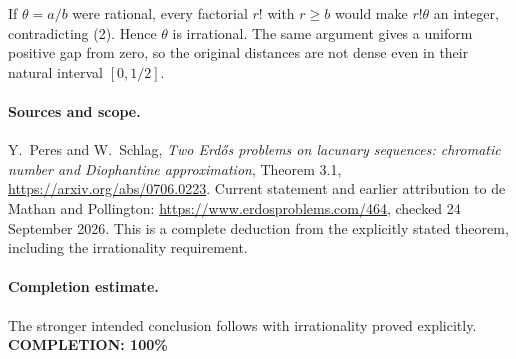 If \(\theta=a/b\) were rational, every factorial \(r!\) with \(r\geq b\)
would make \(r!\theta\) an integer, contradicting (2).
Hence \(\theta\) is irrational. The same argument gives a uniform
positive gap from zero, so the original distances are not dense even
in their natural interval \([0,1/2]\).

\paragraph{Sources and scope.}
Y.~Peres and W.~Schlag, \emph{Two Erd\H{o}s problems on lacunary
sequences: chromatic number and Diophantine approximation},
Theorem 3.1, \url{https://arxiv.org/abs/0706.0223}.
Current statement and earlier attribution to de Mathan and Pollington:
\url{https://www.erdosproblems.com/464}, checked 24 September 2026.
This is a complete deduction from the explicitly stated theorem,
including the irrationality requirement.

\paragraph{Completion estimate.}
The stronger intended conclusion follows with irrationality proved explicitly.
\textbf{COMPLETION: 100\%}
